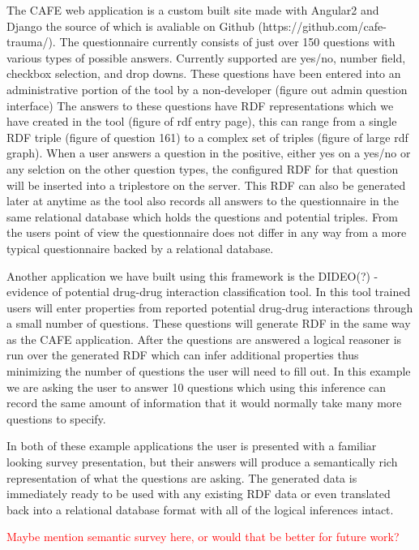 \documentclass{amia}
\begin{document}
The CAFE web application is a custom built site made with Angular2 and Django the source of which is avaliable on Github (https://github.com/cafe-trauma/).  The questionnaire currently consists of just over 150 questions with various types of possible answers.  Currently supported are yes/no, number field, checkbox selection, and drop downs.  These questions have been entered into an administrative portion of the tool by a non-developer (figure out admin question interface)  The answers to these questions have RDF representations which we have created in the tool (figure of rdf entry page), this can range from a single RDF triple (figure of question 161) to a complex set of triples (figure of large rdf graph).  When a user answers a question in the positive, either yes on a yes/no or any selction on the other question types, the configured RDF for that question will be inserted into a triplestore on the server.  This RDF can also be generated later at anytime as the tool also records all answers to the questionnaire in the same relational database which holds the questions and potential triples.  From the users point of view the questionnaire does not differ in any way from a more typical questionnaire backed by a relational database.

Another application we have built using this framework is the DIDEO(?) - evidence of potential drug-drug interaction classification tool.  In this tool trained users will enter properties from reported potential drug-drug interactions through a small number of questions.  These questions will generate RDF in the same way as the CAFE application.  After the questions are answered a logical reasoner is run over the generated RDF which can infer additional properties thus minimizing the number of questions the user will need to fill out.  In this example we are asking the user to answer 10 questions which using this inference can record the same amount of information that it would normally take many more questions to specify.

In both of these example applications the user is presented with a familiar looking survey presentation, but their answers will produce a semantically rich representation of what the questions are asking.  The generated data is immediately ready to be used with any existing RDF data or even translated back into a relational database format with all of the logical inferences intact.

\textcolor{red}{Maybe mention semantic survey here, or would that be better for future work?}
\end{document}
